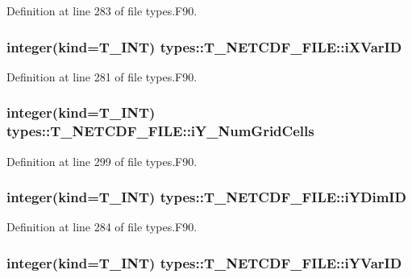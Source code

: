 Definition at line 283 of file types.F90.

\hypertarget{typetypes_1_1_t___n_e_t_c_d_f___f_i_l_e_a025ba636afde8ade0617ebf15f319624}{
\subsubsection[{iXVarID}]{\setlength{\rightskip}{0pt plus 5cm}integer(kind={\bf T\_\-INT}) {\bf types::T\_\-NETCDF\_\-FILE::iXVarID}}}
\label{typetypes_1_1_t___n_e_t_c_d_f___f_i_l_e_a025ba636afde8ade0617ebf15f319624}


Definition at line 281 of file types.F90.

\hypertarget{typetypes_1_1_t___n_e_t_c_d_f___f_i_l_e_ace63e40f95572e1ff3359e428d012766}{
\subsubsection[{iY\_\-NumGridCells}]{\setlength{\rightskip}{0pt plus 5cm}integer(kind={\bf T\_\-INT}) {\bf types::T\_\-NETCDF\_\-FILE::iY\_\-NumGridCells}}}
\label{typetypes_1_1_t___n_e_t_c_d_f___f_i_l_e_ace63e40f95572e1ff3359e428d012766}


Definition at line 299 of file types.F90.

\hypertarget{typetypes_1_1_t___n_e_t_c_d_f___f_i_l_e_afb87e7393dc5c56eef13a570f5a87572}{
\subsubsection[{iYDimID}]{\setlength{\rightskip}{0pt plus 5cm}integer(kind={\bf T\_\-INT}) {\bf types::T\_\-NETCDF\_\-FILE::iYDimID}}}
\label{typetypes_1_1_t___n_e_t_c_d_f___f_i_l_e_afb87e7393dc5c56eef13a570f5a87572}


Definition at line 284 of file types.F90.

\hypertarget{typetypes_1_1_t___n_e_t_c_d_f___f_i_l_e_ae2c72e3295d5211120d71139e0d2d911}{
\subsubsection[{iYVarID}]{\setlength{\rightskip}{0pt plus 5cm}integer(kind={\bf T\_\-INT}) {\bf types::T\_\-NETCDF\_\-FILE::iYVarID}}}
\label{typetypes_1_1_t___n_e_t_c_d_f___f_i_l_e_ae2c72e3295d5211120d71139e0d2d911}



